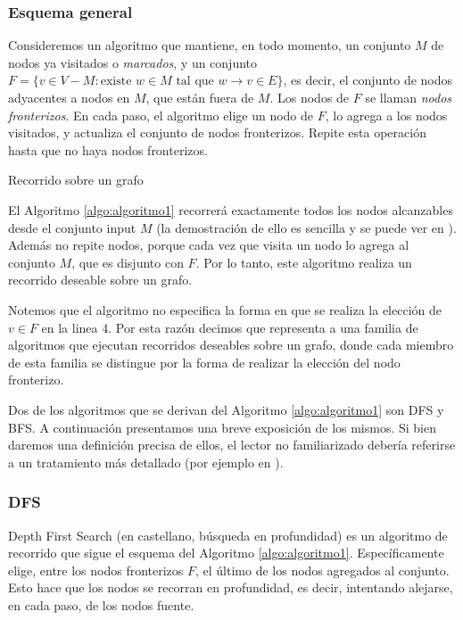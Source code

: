 \subsubsection{Esquema general}
\label{subsubsec:esquema}
Consideremos un algoritmo que mantiene, en todo momento, un conjunto $M$ de nodos ya visitados o \textit{marcados}, y un conjunto $F = \{v \in V - M : \text{existe }w\in M\text{ tal que }w \to v \in E\}$, es decir, el conjunto de nodos adyacentes a nodos en $M$, que están fuera de $M$. Los nodos de $F$ se llaman \textit{nodos fronterizos}. En cada paso, el algoritmo elige un nodo de $F$, lo agrega a los nodos visitados, y actualiza el conjunto de nodos fronterizos. Repite esta operación hasta que no haya nodos fronterizos.

\begin{algorithm}
	\dontprintsemicolon
 	\BlankLine
\caption{Recorrido sobre un grafo}
\label{algo:algoritmo1}
\end{algorithm}

El Algoritmo \ref{algo:algoritmo1} recorrerá exactamente todos los nodos alcanzables desde el conjunto input $M$ (la demostración de ello es sencilla y se puede ver en \cite{gross06}). Además no repite nodos, porque cada vez que visita un nodo lo agrega al conjunto $M$, que es disjunto con $F$. Por lo tanto, este algoritmo realiza un recorrido deseable sobre un grafo.

Notemos que el algoritmo no especifica la forma en que se realiza la elección de $v \in F$ en la linea 4. Por esta razón decimos que representa a una familia de algoritmos que ejecutan recorridos deseables sobre un grafo, donde cada miembro de esta familia se distingue por la forma de realizar la elección del nodo fronterizo.

Dos de los algoritmos que se derivan del Algoritmo \ref{algo:algoritmo1} son DFS y BFS. A continuación presentamos una breve exposición de los mismos. Si bien daremos una definición precisa de ellos, el lector no familiarizado debería referirse a un tratamiento más detallado (por ejemplo en \cite{cormen01}).

\subsubsection{DFS}
Depth First Search (en castellano, búsqueda en profundidad) es un algoritmo de recorrido que sigue el esquema del Algoritmo \ref{algo:algoritmo1}. Específicamente elige, entre los nodos fronterizos $F$, el último de los nodos agregados al conjunto. Esto hace que los nodos se recorran en profundidad, es decir, intentando alejarse, en cada paso, de los nodos fuente.

